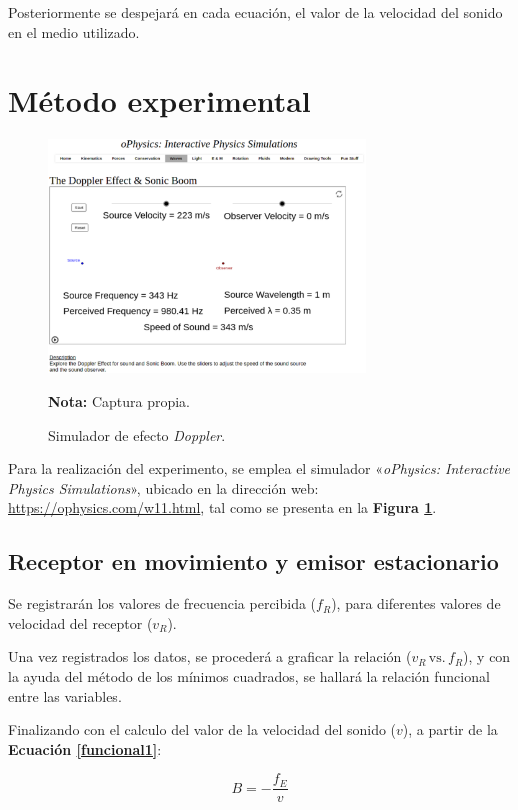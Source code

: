 \documentclass[letter,11pt]{article}
\newcommand{\source}[1]{\vspace{-11pt} \caption*{\small{\textbf{Nota:} {#1}}}}
\begin{document}
Posteriormente se despejará en cada ecuación, el valor de la velocidad del
sonido en el medio utilizado.

\section{Método experimental}

\begin{figure}
\centering
\includegraphics[width=0.75\textwidth]{resources/f4.eps}
\caption{Simulador de efecto \emph{Doppler}.}
\label{figura4}
\source{Captura propia.}
\end{figure}

Para la realización del experimento, se emplea el simulador «\emph{oPhysics:
Interactive Physics Simulations}», ubicado en la dirección web:
\url{https://ophysics.com/w11.html}, tal como se presenta en la
\textbf{Figura \ref{figura4}}.

\subsection{Receptor en movimiento y emisor estacionario}

Se registrarán los valores de frecuencia percibida ($f_R$), para diferentes
valores de velocidad del receptor ($v_R$).

Una vez registrados los datos, se procederá a graficar la relación
($v_R\,\text{vs.}\,f_R$), y con la ayuda del método de los mínimos cuadrados, se
hallará la relación funcional entre las variables.

Finalizando con el calculo del valor de la velocidad del sonido ($v$), a partir
de la \textbf{Ecuación \ref{funcional1}}:

\begin{equation*}
    B = - \frac{f_E}{v}
\end{equation*}
\vspace{0.10cm}
\end{document}
